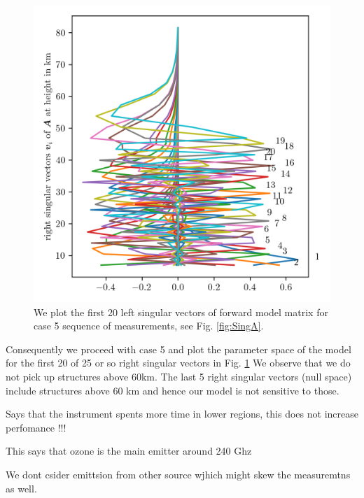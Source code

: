 \begin{figure}[ht!]
	\centering
	\includegraphics{SingVecA.png}
	\caption[Left singular vectors of forward model matrix for one sequence of measurements.]{We plot the first 20 left singular vectors of forward model matrix for case 5 sequence of measurements, see Fig. \ref{fig:SingA}.}
	\label{fig:SingVecA}
\end{figure}
\begin{figure}[ht!]
	\centering
	\caption[]{}
	\label{fig:nullSpace}
\end{figure}
Consequently we proceed with case 5 and plot the parameter space of the model for the first 20 of 25 or so right singular vectors in Fig. \ref{fig:SingVecA}
We observe that we do not pick up structures above 60km.
The last 5 right singular vectors (null space) include structures above 60 km and hence our model is not sensitive to those.

\cite{livesey2006retrieval} Says that the instrument spents more time in lower regions, this does not increase perfomance !!!


This says that ozone is the main emitter around 240 Ghz \cite[34]{livesey2008ozonecarbonmono}

We dont csider emittsion from other source wjhich might skew the measuremtns as well.

